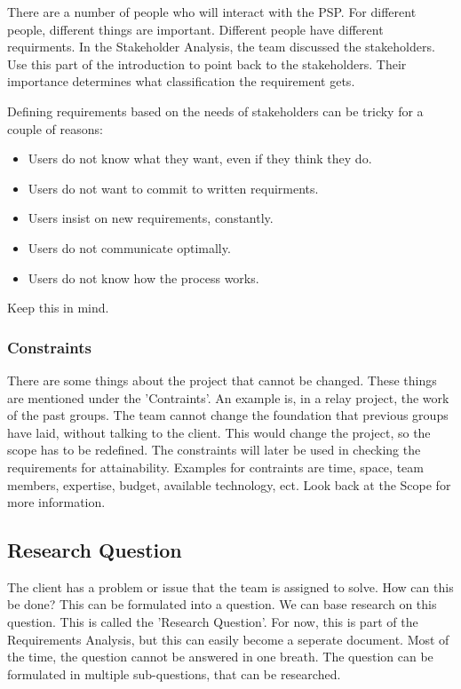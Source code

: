 \documentclass[10pt]{report}
\begin{document}
There are a number of people who will interact with the PSP. For different people, different things are important. Different people have different requirments. In the Stakeholder Analysis, the team discussed the stakeholders. Use this part of the introduction to point back to the stakeholders. Their importance determines what classification the requirement gets.

Defining requirements based on the needs of stakeholders can be tricky for a couple of reasons:

\begin{itemize}
	\item Users do not know what they want, even if they think they do.
	\item Users do not want to commit to written requirments.
	\item Users insist on new requirements, constantly.
	\item Users do not communicate optimally.
	\item Users do not know how the process works.
\end{itemize}

Keep this in mind.

\subsubsection{Constraints}

There are some things about the project that cannot be changed. These things are mentioned under the 'Contraints'. An example is, in a relay project, the work of the past groups. The team cannot change the foundation that previous groups have laid, without talking to the client. This would change the project, so the scope has to be redefined. The constraints will later be used in checking the requirements for attainability. Examples for contraints are time, space, team members, expertise, budget, available technology, ect. Look back at the Scope for more information.

\subsection{Research Question}

The client has a problem or issue that the team is assigned to solve. How can this be done? This can be formulated into a question. We can base research on this question. This is called the 'Research Question'. For now, this is part of the Requirements Analysis, but this can easily become a seperate document. Most of the time, the question cannot be answered in one breath. The question can be formulated in multiple sub-questions, that can be researched.
\end{document}

